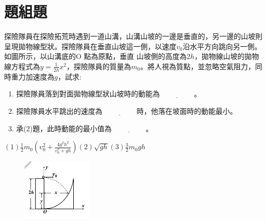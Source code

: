 \documentclass[cn,10pt,math=newtx]{elegantbook}
\begin{document}
\section{題組題}


\begin{example}
   探險隊員在探險拓荒時遇到一道山溝，山溝山坡的一邊是垂直的，另一邊的山坡則呈現拋物線型狀。探險隊員在垂直山坡這一側，以速度$v_0$沿水平方向跳向另一側。如圖所示，以山溝底的O 點為原點，垂直
山坡側的高度為2$h$，拋物線山坡的拋物線方程式為$y=\frac{1}{2h}x^2$，探險隊員的質量為$m_0$。將人視為質點，並忽略空氣阻力，同時重力加速度為$g$，試求:
\begin{enumerate}[label=(\arabic*)] 
  \item 探險隊員落到對面拋物線型狀山坡時的動能為$\underline{\hspace{2cm}}$。
  \item 探險隊員水平跳出的速度為$\underline{\hspace{2cm}}$時，他落在坡面時的動能最小。
  \item 承(2)題，此時動能的最小值為$\underline{\hspace{2cm}}$。
    \end{enumerate}
    \rightline{[復興高中教甄109]}
\end{example}
\begin{solution}
    $(1) \frac{1}{2} m_0(v^2_0+\frac{4g^2 h^2}{v^2_0+gh})  (2) \sqrt{gh}  (3) \frac{3}{2} m_0 gh$
\end{solution}
\begin{figure}[htbp]
    \flushright
    \includegraphics[width=0.3\textwidth]{image/109復興11.png}
  \end{figure}
\newpage
\end{document}

